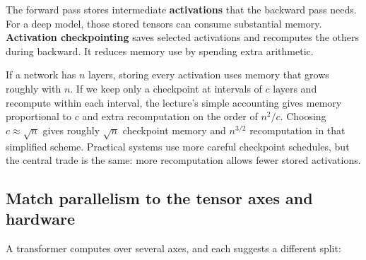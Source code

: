 \hypertarget{04-visual-computing-ii-ch031-checkpoint-activations-when-memory-is-the-limit}{}

The forward pass stores intermediate \textbf{activations} that the backward pass needs. For a deep model, those stored tensors can consume substantial memory. \textbf{Activation checkpointing} saves selected activations and recomputes the others during backward. It reduces memory use by spending extra arithmetic.

If a network has \(n\) layers, storing every activation uses memory that grows roughly with \(n\). If we keep only a checkpoint at intervals of \(c\) layers and recompute within each interval, the lecture's simple accounting gives memory proportional to \(c\) and extra recomputation on the order of \(n^2/c\). Choosing \(c\approx\sqrt n\) gives roughly \(\sqrt n\) checkpoint memory and \(n^{3/2}\) recomputation in that simplified scheme. Practical systems use more careful checkpoint schedules, but the central trade is the same: more recomputation allows fewer stored activations.

\subsection{Match parallelism to the tensor axes and hardware}\label{04-visual-computing-ii-ch031-match-parallelism-to-the-tensor-axes-and-hardware}

\hypertarget{04-visual-computing-ii-ch031-match-parallelism-to-the-tensor-axes-and-hardware}{}

A transformer computes over several axes, and each suggests a different split:

